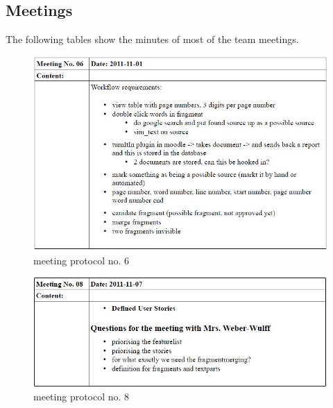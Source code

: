 \begin{appendix}

\chapter{Meetings}\label{ch:Meetings}
The following tables show the minutes of most of the team meetings.

\begin{figure}[htbp]
  \centering
    \includegraphics[width=\textwidth]{images/a_meetings/meeting_6}
  \caption{meeting protocol no. 6}
  \label{fig:meeting protocol no. 6}
\end{figure}

\begin{figure}[htbp]
  \centering
    \includegraphics[width=\textwidth]{images/a_meetings/meeting_8}
  \caption{meeting protocol no. 8}
  \label{fig:meeting protocol no. 8}
\end{figure}


\end{appendix}
